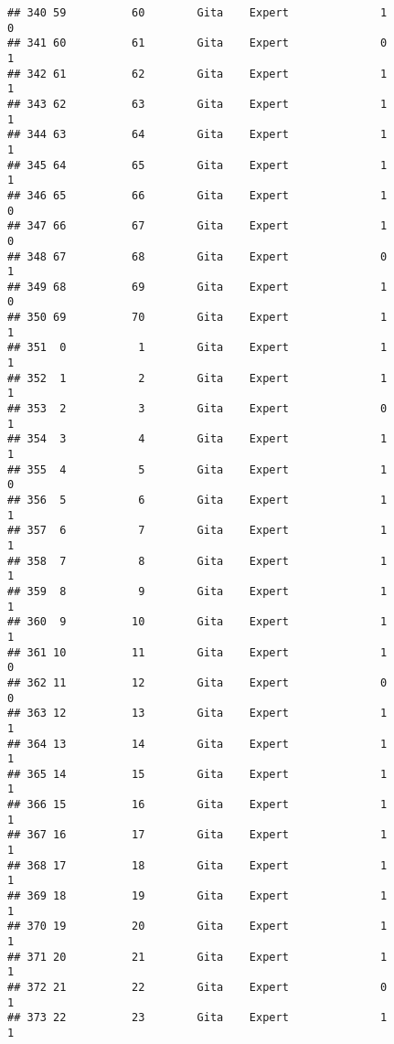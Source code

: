 \documentclass[
]{article}
\begin{document}
\begin{verbatim}
## 340 59          60        Gita    Expert              1                 0
## 341 60          61        Gita    Expert              0                 1
## 342 61          62        Gita    Expert              1                 1
## 343 62          63        Gita    Expert              1                 1
## 344 63          64        Gita    Expert              1                 1
## 345 64          65        Gita    Expert              1                 1
## 346 65          66        Gita    Expert              1                 0
## 347 66          67        Gita    Expert              1                 0
## 348 67          68        Gita    Expert              0                 1
## 349 68          69        Gita    Expert              1                 0
## 350 69          70        Gita    Expert              1                 1
## 351  0           1        Gita    Expert              1                 1
## 352  1           2        Gita    Expert              1                 1
## 353  2           3        Gita    Expert              0                 1
## 354  3           4        Gita    Expert              1                 1
## 355  4           5        Gita    Expert              1                 0
## 356  5           6        Gita    Expert              1                 1
## 357  6           7        Gita    Expert              1                 1
## 358  7           8        Gita    Expert              1                 1
## 359  8           9        Gita    Expert              1                 1
## 360  9          10        Gita    Expert              1                 1
## 361 10          11        Gita    Expert              1                 0
## 362 11          12        Gita    Expert              0                 0
## 363 12          13        Gita    Expert              1                 1
## 364 13          14        Gita    Expert              1                 1
## 365 14          15        Gita    Expert              1                 1
## 366 15          16        Gita    Expert              1                 1
## 367 16          17        Gita    Expert              1                 1
## 368 17          18        Gita    Expert              1                 1
## 369 18          19        Gita    Expert              1                 1
## 370 19          20        Gita    Expert              1                 1
## 371 20          21        Gita    Expert              1                 1
## 372 21          22        Gita    Expert              0                 1
## 373 22          23        Gita    Expert              1                 1

\end{verbatim}
\end{document}
